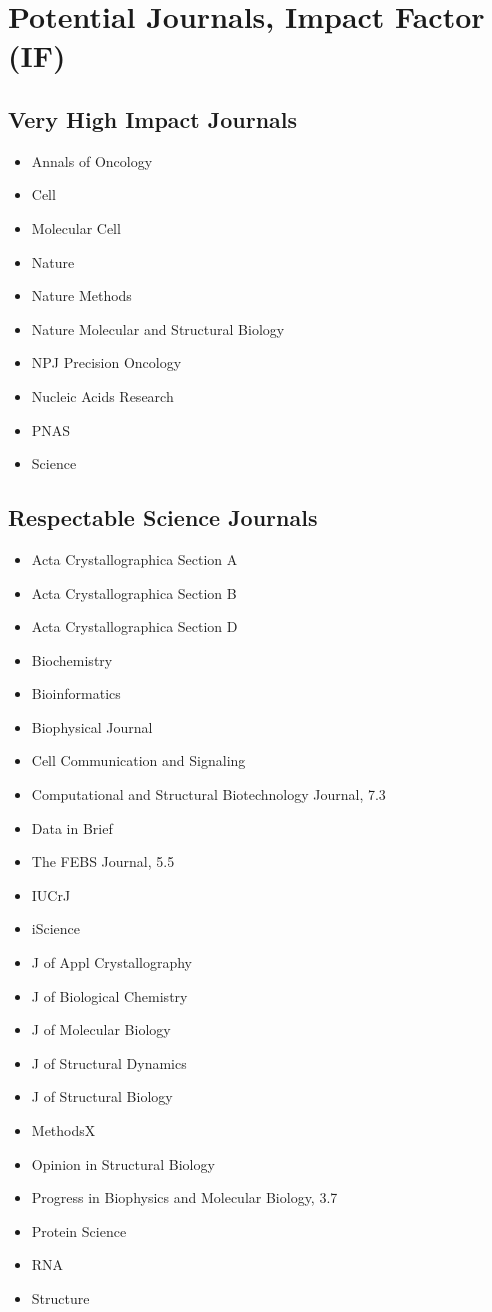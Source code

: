 \documentclass[10pt,letterpaper]{article}
\begin{document}
\section{Potential Journals, Impact Factor (IF)}

\subsection{Very High Impact Journals}

\begin{itemize}
  \item Annals of Oncology
  \item Cell
  \item Molecular Cell
  \item Nature
  \item Nature Methods
  \item Nature Molecular and Structural Biology
  \item NPJ Precision Oncology
  \item Nucleic Acids Research
  \item PNAS
  \item Science
\end{itemize}


\subsection{Respectable Science Journals}


\begin{itemize}
  \item Acta Crystallographica Section A
  \item Acta Crystallographica Section B
  \item Acta Crystallographica Section D
  \item Biochemistry
  \item Bioinformatics
  \item Biophysical Journal
  \item Cell Communication and Signaling
  \item Computational and Structural Biotechnology Journal, 7.3
  \item Data in Brief
  \item The FEBS Journal, 5.5
  \item IUCrJ
  \item iScience
  \item J of Appl Crystallography
  \item J of Biological Chemistry
  \item J of Molecular Biology
  \item J of Structural Dynamics
  \item J of Structural Biology
  \item MethodsX
  \item Opinion in Structural Biology
  \item Progress in Biophysics and Molecular Biology, 3.7
  \item Protein Science
  \item RNA
  \item Structure
\end{itemize}
\end{document}
